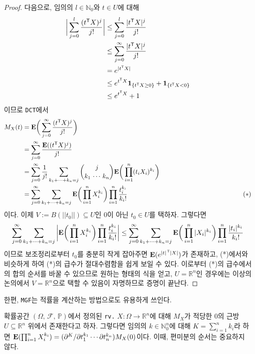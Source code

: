 \begin{proof}
    다음으로, 임의의 $l\in\mathbb{N}_0$와 $t\in U$에 대해
    \begin{align*}
        \bigg|\sum_{j=0}^l\frac{(t^{\mathsf{T}} X)^j}{j!}\bigg|&\leq\sum_{j=0}^l\frac{|t^{\mathsf{T}} X|^j}{j!}\\
        &\leq\sum_{j=0}^\infty\frac{|t^{\mathsf{T}} X|^j}{j!}\\
        &=e^{|t^{\mathsf{T}} X|}\\
        &\leq e^{t^{\mathsf{T}} X}\mathbf{1}_{\{t^{\mathsf{T}} X\geq0\}}+\mathbf{1}_{\{t^{\mathsf{T}} X<0\}}\\
        &\leq e^{t^{\mathsf{T}} X}+1
    \end{align*}
    이므로 \texttt{DCT}에서
    \begin{align*}
        M_X(t)&=\mathbf{E}\bigg(\sum_{j=0}^\infty\frac{(t^{\mathsf{T}} X)^j}{j!}\bigg)\\
        &=\sum_{j=0}^\infty\frac{\mathbf{E}((t^{\mathsf{T}} X)^j)}{j!}\\
        &=\sum_{j=0}^\infty\frac{1}{j!}\sum_{k_1+\cdots+k_n=j}\binom{j}{k_1\,\cdots\,k_n}\mathbf{E}\bigg(\prod_{i=1}^n(t_iX_i)^{k_i}\bigg)\\
        &=\sum_{j=0}^\infty\sum_{k_1+\cdots+k_n=j}\mathbf{E}\bigg(\prod_{i=1}^nX_i^{k_i}\bigg)\prod_{i=1}^n\frac{t_i^{k_i}}{k_i!}&\qquad\qquad\qquad\qquad\qquad\qquad(*)
    \end{align*}
    이다. 이제 $V:=B(||t_0||)\subseteq U$인 $0$이 아닌 $t_0\in U$를 택하자. 그렇다면
    \begin{equation*}
        \sum_{j=0}^\infty\sum_{k_1+\cdots+k_n=j}\bigg|\mathbf{E}\bigg(\prod_{i=1}^nX_i^{k_i}\bigg)\prod_{i=1}^n\frac{t_i^{k_i}}{k_i!}\bigg|\leq\sum_{j=0}^\infty\sum_{k_1+\cdots+k_n=j}\mathbf{E}\bigg(\prod_{i=1}^n|X_i|^{k_i}\bigg)\prod_{i=1}^n\frac{|t_i|^{k_i}}{k_i!}
    \end{equation*}
    이므로 보조정리로부터 $t_0$를 충분히 작게 잡아주면 $\mathbf{E}(e^{|t|^{\,\mathsf{T}}|X|})$가 존재하고, (*)에서와 비슷하게 하여 (*)의 급수가 절대수렴함을 쉽게 보일 수 있다. 이로부터 (*)의 급수에서의 합의 순서를 바꿀 수 있으므로 원하는 형태의 식을 얻고, $U=\mathbb{R}^n$인 경우에는 이상의 논의에서 $V=\mathbb{R}^n$으로 택할 수 있음이 자명하므로 증명이 끝난다.
\end{proof}

한편, \texttt{MGF}는 적률을 계산하는 방법으로도 유용하게 쓰인다.

\begin{theorem}\label{thm:MGFDifferentiation}
    확률공간 $(\Omega,\,\mathcal{F},\,\mathbb{P})$에서 정의된 \texttt{rv.} $X:\Omega\to\mathbb{R}^n$에 대해 $M_X$가 적당한 $0$의 근방 $U\subseteq\mathbb{R}^n$ 위에서 존재한다고 하자. 그렇다면 임의의 $k\in\mathbb{N}_0^n$에 대해 $K=\sum_{i=1}^nk_i$라 하면 $\mathbf{E}(\prod_{i=1}^nX_i^{k_i})=(\partial^K/\partial t_1^{k_1}\cdots\partial t_n^{k_n})M_X(0)$이다. 이때, 편미분의 순서는 중요하지 않다.
\end{theorem}


